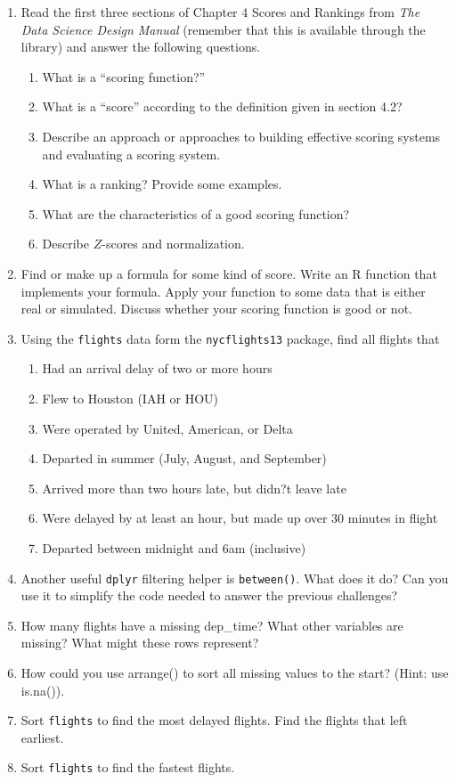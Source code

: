 \documentclass[12pt]{article}
\begin{document}
\begin{enumerate}
    \item Read the first three sections of Chapter 4 Scores and Rankings from \emph{The Data Science Design Manual} (remember that this is available through the library) and answer the following questions.
     \begin{enumerate}
      \item  What is a ``scoring function?''
      \item What is a ``score'' according to the definition given in section 4.2?
      \item Describe an approach or approaches to building effective scoring systems and evaluating a scoring system. 
      \item What is a ranking? Provide some examples. 
      \item What are the characteristics of a good scoring function? 
      \item Describe $Z$-scores and normalization.       
    \end{enumerate}
    \item Find or make up a formula for some kind of score. Write an R function that implements your formula. Apply your function to some data that is either real or simulated.  Discuss whether your scoring function is good or not.  
    \item Using the {\tt flights} data form the {\tt nycflights13} package,  find all flights that
    \begin{enumerate}
      \item Had an arrival delay of two or more hours
      \item Flew to Houston (IAH or HOU)
      \item Were operated by United, American, or Delta
      \item Departed in summer (July, August, and September)
      \item Arrived more than two hours late, but didn?t leave late
      \item Were delayed by at least an hour, but made up over 30 minutes in flight
      \item Departed between midnight and 6am (inclusive)
    \end{enumerate}
    \item Another useful {\tt dplyr} filtering helper is {\tt between()}. What does it do? Can you use it to simplify the code needed to answer the previous challenges?
    \item How many flights have a missing dep\_time? What other variables are missing? What might these rows represent?
    \item How could you use arrange() to sort all missing values to the start? (Hint: use is.na()).
    \item Sort {\tt flights} to find the most delayed flights. Find the flights that left earliest.
    \item Sort {\tt flights} to find the fastest flights.
  \end{enumerate}
\end{document}
